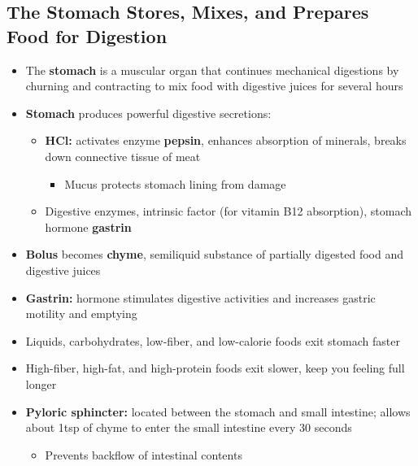 \documentclass[12pt]{article}
\begin{document}
        \subsection{The Stomach Stores, Mixes, and Prepares Food for Digestion}
            \begin{itemize}
                \item The \textbf{stomach} is a muscular organ that continues mechanical digestions by churning and contracting to mix food with digestive juices for several hours
                \item \textbf{Stomach} produces powerful digestive secretions:
                    \begin{itemize}
                        \item \textbf{HCl:} activates enzyme \textbf{pepsin}, enhances absorption of minerals, breaks down connective tissue of meat
                            \begin{itemize}
                                \item Mucus protects stomach lining from damage
                            \end{itemize}
                        \item Digestive enzymes, intrinsic factor (for vitamin B12 absorption), stomach hormone \textbf{gastrin}
                    \end{itemize}
                \item \textbf{Bolus} becomes \textbf{chyme}, semiliquid substance of partially digested food and digestive juices
                \item \textbf{Gastrin:} hormone stimulates digestive activities and increases gastric motility and emptying
                \item Liquids, carbohydrates, low-fiber, and low-calorie foods exit stomach faster
                \item High-fiber, high-fat, and high-protein foods exit slower, keep you feeling full longer
                \item \textbf{Pyloric sphincter:} located between the stomach and small intestine; allows about 1tsp of chyme to enter the small intestine every 30 seconds
                    \begin{itemize}
                        \item Prevents backflow of intestinal contents
                    \end{itemize}
            \end{itemize}
\end{document}
